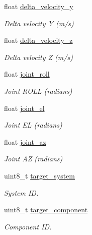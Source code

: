 \begin{DoxyCompactItemize}
float \hyperlink{struct____mavlink__gimbal__report__t_a44de0ec61ce377e5f7c947942f71fc95}{delta\+\_\+velocity\+\_\+y}
\begin{DoxyCompactList}\small\item\em Delta velocity Y (m/s) \end{DoxyCompactList}\item 
float \hyperlink{struct____mavlink__gimbal__report__t_a88a7f8842d34cb2428ee1ada0d994fe1}{delta\+\_\+velocity\+\_\+z}
\begin{DoxyCompactList}\small\item\em Delta velocity Z (m/s) \end{DoxyCompactList}\item 
float \hyperlink{struct____mavlink__gimbal__report__t_a5e1ca7e83ccedc11cb9c0d0f4c8aff7a}{joint\+\_\+roll}
\begin{DoxyCompactList}\small\item\em Joint R\+O\+L\+L (radians) \end{DoxyCompactList}\item 
float \hyperlink{struct____mavlink__gimbal__report__t_a9ad8af25e21729b1869e9060ceb5c2ee}{joint\+\_\+el}
\begin{DoxyCompactList}\small\item\em Joint E\+L (radians) \end{DoxyCompactList}\item 
float \hyperlink{struct____mavlink__gimbal__report__t_af08a4e4ac9980af9b920a0553f863261}{joint\+\_\+az}
\begin{DoxyCompactList}\small\item\em Joint A\+Z (radians) \end{DoxyCompactList}\item 
uint8\+\_\+t \hyperlink{struct____mavlink__gimbal__report__t_a4e27e7a39534606377aa93a904197d82}{target\+\_\+system}
\begin{DoxyCompactList}\small\item\em System I\+D. \end{DoxyCompactList}\item 
uint8\+\_\+t \hyperlink{struct____mavlink__gimbal__report__t_a8429086f0e8457633c4cbbe7ffd61f33}{target\+\_\+component}
\begin{DoxyCompactList}\small\item\em Component I\+D. \end{DoxyCompactList}\end{DoxyCompactItemize}


